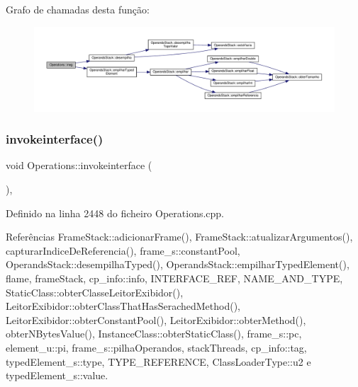 Grafo de chamadas desta função\+:
\nopagebreak
\begin{figure}[H]
\begin{center}
\leavevmode
\includegraphics[width=350pt]{classOperations_a819d5dd66c64a6801a1599b5abf81ae7_cgraph}
\end{center}
\end{figure}
\mbox{\label{classOperations_a9206595fad5d3ac24514b2dfd6a013da}} 
\subsubsection{\texorpdfstring{invokeinterface()}{invokeinterface()}}
{\footnotesize\ttfamily void Operations\+::invokeinterface (\begin{DoxyParamCaption}{ }\end{DoxyParamCaption})\hspace{0.3cm}{\ttfamily [static]}, {\ttfamily [private]}}



Definido na linha 2448 do ficheiro Operations.\+cpp.



Referências Frame\+Stack\+::adicionar\+Frame(), Frame\+Stack\+::atualizar\+Argumentos(), capturar\+Indice\+De\+Referencia(), frame\+\_\+s\+::constant\+Pool, Operands\+Stack\+::desempilha\+Typed(), Operands\+Stack\+::empilhar\+Typed\+Element(), flame, frame\+Stack, cp\+\_\+info\+::info, I\+N\+T\+E\+R\+F\+A\+C\+E\+\_\+\+R\+EF, N\+A\+M\+E\+\_\+\+A\+N\+D\+\_\+\+T\+Y\+PE, Static\+Class\+::obter\+Classe\+Leitor\+Exibidor(), Leitor\+Exibidor\+::obter\+Class\+That\+Has\+Serached\+Method(), Leitor\+Exibidor\+::obter\+Constant\+Pool(), Leitor\+Exibidor\+::obter\+Method(), obter\+N\+Bytes\+Value(), Instance\+Class\+::obter\+Static\+Class(), frame\+\_\+s\+::pc, element\+\_\+u\+::pi, frame\+\_\+s\+::pilha\+Operandos, stack\+Threads, cp\+\_\+info\+::tag, typed\+Element\+\_\+s\+::type, T\+Y\+P\+E\+\_\+\+R\+E\+F\+E\+R\+E\+N\+CE, Class\+Loader\+Type\+::u2 e typed\+Element\+\_\+s\+::value.


